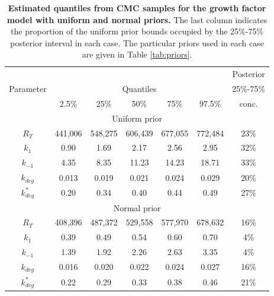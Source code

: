 \begin{table}
\begin{tabular}{c|ccccc|c}
\toprule 
&&&&&&                                         Posterior \\
Parameter &  \multicolumn{5}{c}{Quantiles} &   25\%-75\% \\
          & 2.5\% & 25\% & 50\% & 75\% & 97.5\% & conc.\\
\toprule
\multicolumn{7}{c}{Uniform prior} \\
\toprule
$R_T$       &  441,006 & 548,275 & 606,439 & 677,055 & 772,484 & 23\%\\
$k_1$       &  0.90 & 1.69 & 2.17 & 2.56 & 2.95 & 32\%\\
$k_{-1}$    & 4.35 & 8.35 & 11.23 & 14.23 & 18.71 & 33\%\\
$k_{deg}$   & 0.013 & 0.019 & 0.021 & 0.024 & 0.029 & 20\%\\
$k^*_{deg}$ & 0.20 & 0.34 & 0.40 & 0.44 & 0.49 & 27\%\\
\toprule
\multicolumn{7}{c}{Normal prior} \\
\toprule
$R_T$       & 408,396 & 487,372 & 529,558 & 577,970 & 678,632 & 16\%\\
$k_1$       & 0.39 & 0.49 & 0.54 & 0.60 & 0.70 & 4\%\\
$k_{-1}$    & 1.39 & 1.92 & 2.26 & 2.63 & 3.35 & 4\%\\
$k_{deg}$   & 0.016 & 0.020 & 0.022 & 0.024 & 0.027 & 16\%\\
$k^*_{deg}$ & 0.22 & 0.29 & 0.33 & 0.38 & 0.46 & 21\%\\
\end{tabular}
\caption{\textbf{Estimated quantiles from CMC samples for the growth factor model with uniform and normal priors.} The last column indicates the proportion of the uniform prior bounds occupied by the 25\%-75\% posterior interval in each case. The particular priors used in each case are given in Table \ref{tab:priors}.}
\label{tab:growth_factor_results}
\end{table}

